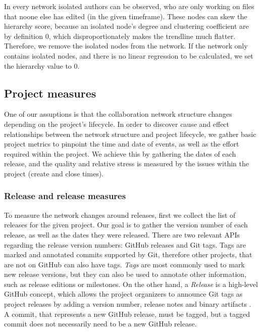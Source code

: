 In every network isolated authors can be observed, who are only working on files that noone else has edited (in the given timeframe). These nodes can skew the hierarchy score, because an isolated node's degree and clustering coefficient are by definition 0, which disproportionately makes the trendline much flatter. Therefore, we remove the isolated nodes from the network. If the network only contains isolated nodes, and there is no linear regression to be calculated, we set the hierarchy value to 0.

\subsection{Project measures}

One of our assuptions is that the collaboration network structure changes depending on the project's lifecycle. In order to discover cause and effect relationships between the network structure and project lifecycle, we gather basic project metrics to pinpoint the time and date of events, as well as the effort required within the project. We achieve this by gathering the dates of each release, and the quality and relative stress is measured by the issues within the project (create and close times).

\subsubsection{Release and release measures}

To measure the network changes around releases, first we collect the list of releases for the given project. Our goal is to gather the version number of each release, as well as the dates they were released. There are two relevant APIs regarding the release version numbers: GitHub releases and Git tags. Tags are marked and annotated commits supported by Git, therefore other projects, that are not on GitHub can also have tags. \textit{Tags} are most commonly used to mark new release versions, but they can also be used to annotate other information, such as release editions or milestones. On the other hand, a \textit{Release} is a high-level GitHub concept, which allows the project organizers to announce Git tags as project releases by adding a version number, release notes and binary artifacts \cite{olsonReleaseYourSoftware2013}. A commit, that represents a new GitHub release, must be tagged, but a tagged commit does not necessarily need to be a new GitHub release. \\

